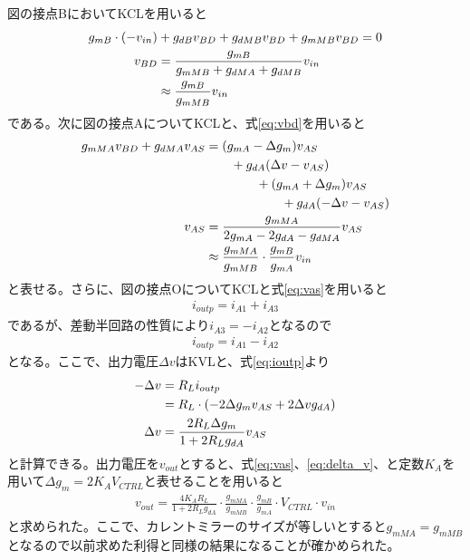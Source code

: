 \documentclass[twocolumn]{jsarticle}
\begin{document}
    図の接点BにおいてKCLを用いると
    \begin{align}
        g_{mB}\cdot(-v_{in})&+g_{dB}v_{BD} +g_{dMB}v_{BD}+g_{mMB}v_{BD}=0       \notag\\
        v_{BD}&=\frac{g_{mB}}{g_{mMB}+g_{dMA}+g_{dMB}}v_{in}          \notag\\
        &\approx \frac{g_{mB}}{g_{mMB}}v_{in}    \label{eq:vbd}
    \end{align}
    である。次に図の接点AについてKCLと、式\eqref{eq:vbd}を用いると
    \begin{align}
        g_{mMA}v_{BD}+g_{dMA}v_{AS}&=(g_{mA}-\Delta g_{m})v_{AS} \notag\\ &\quad\quad +g_{dA}(\Delta v -v_{AS})       \notag\\
        & \quad\quad\quad\quad +(g_{mA}+\Delta g_{m})v_{AS} \notag\\& \quad\quad\quad\quad\quad\quad +g_{dA}(-\Delta v -v_{AS})       \notag\\
        v_{AS}&=\frac{g_{mMA}}{2g_{mA}-2g_{dA}-g_{dMA}}v_{AS}   \notag\\
        &\approx \frac{g_{mMA}}{g_{mMB}}\cdot\frac{g_{mB}}{g_{mA}}v_{in}    \label{eq:vas}
    \end{align}
    と表せる。さらに、図の接点OについてKCLと式\eqref{eq:vas}を用いると
    \begin{align}
        i_{outp} = i_{A1}+i_{A3}
    \end{align}
    であるが、差動半回路の性質により$i_{A3}=-i_{A2}$となるので
    \begin{align}
        i_{outp} = i_{A1}-i_{A2}    \label{eq:ioutp}
    \end{align}
    となる。ここで、出力電圧$\Delta v$はKVLと、式\eqref{eq:ioutp}より
    \begin{align}
        -\Delta v&=R_{L}i_{outp}    \notag\\
        &=R_{L}\cdot(-2\Delta g_{m}v_{AS}+2\Delta vg_{dA})      \notag\\
        \Delta v&=\frac{2R_{L}\Delta g_{m}}{1+2R_{L}g_{dA}}v_{AS}   \label{eq:delta_v}
    \end{align}
    と計算できる。出力電圧を$v_{out}$とすると、式\eqref{eq:vas}、\eqref{eq:delta_v}、と定数$K_{A}$を用いて$\Delta g_{m}=2K_{A}V_{CTRL}$と表せることを用いると
    \begin{align}
        v_{out}=\frac{4K_{A}R_{L}}{1+2R_{L}g_{dA}}\cdot\frac{g_{mMA}}{g_{mMB}}\cdot\frac{g_{mB}}{g_{mA}}\cdot V_{CTRL}\cdot v_{in}     \label{eq:vout}
    \end{align}
    と求められた。ここで、カレントミラーのサイズが等しいとすると$g_{mMA}=g_{mMB}$となるので以前求めた利得と同様の結果になることが確かめられた。
\end{document}
